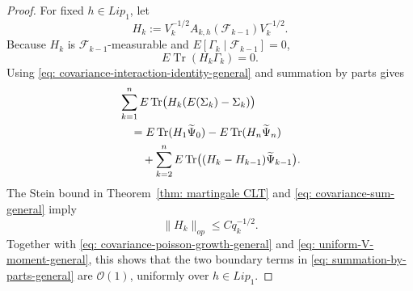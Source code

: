 \documentclass[11pt]{article}
\begin{document}
\begin{proof}
For fixed $h\in Lip_1$, let
\[
    H_k
    :=
    V_k^{-1/2}
    A_{k,h}(\mathcal F_{k-1})
    V_k^{-1/2}.
\]
Because $H_k$ is $\mathcal F_{k-1}$-measurable and
$E[\Gamma_k\mid\mathcal F_{k-1}]=0$,
\[
    E\operatorname{Tr}(H_k\Gamma_k)=0.
\]
Using \eqref{eq: covariance-interaction-identity-general} and summation by
parts gives
\begin{align}
&\sum_{k=1}^n
E\operatorname{Tr}\bigl(H_k(E(\Sigma_k)-\Sigma_k)\bigr)
\notag\\
&\quad=
E\operatorname{Tr}(H_1\widetilde\Psi_0)
-
E\operatorname{Tr}(H_n\widetilde\Psi_n)
\notag\\
&\qquad+
\sum_{k=2}^n
E\operatorname{Tr}
\bigl((H_k-H_{k-1})\widetilde\Psi_{k-1}\bigr).
\label{eq: summation-by-parts-general}
\end{align}
The Stein bound in Theorem~\ref{thm: martingale CLT} and
\eqref{eq: covariance-sum-general} imply
\[
    \|H_k\|_{op}\leq Cq_k^{-1/2}.
\]
Together with \eqref{eq: covariance-poisson-growth-general} and
\eqref{eq: uniform-V-moment-general}, this shows that the two boundary terms
in \eqref{eq: summation-by-parts-general} are $\mathcal O(1)$, uniformly over
$h\in Lip_1$.


\end{proof}
\end{document}
